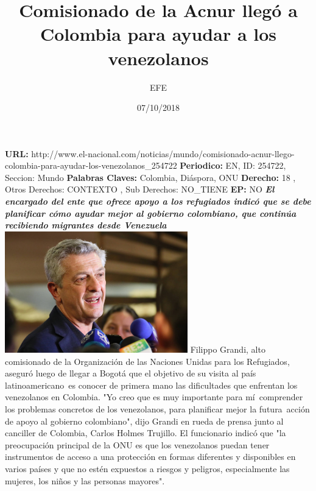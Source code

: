 \documentclass{article}%
\title{\textbf{Comisionado de la Acnur llegó a Colombia para ayudar a los venezolanos}}%
\author{EFE}%
\date{07/10/2018}%
\begin{document}
%
\normalsize%
\maketitle%
\textbf{URL: }%
http://www.el{-}nacional.com/noticias/mundo/comisionado{-}acnur{-}llego{-}colombia{-}para{-}ayudar{-}los{-}venezolanos\_254722\newline%
%
\textbf{Periodico: }%
EN, %
ID: %
254722, %
Seccion: %
Mundo\newline%
%
\textbf{Palabras Claves: }%
Colombia, Diáspora, ONU\newline%
%
\textbf{Derecho: }%
18%
, Otros Derechos: %
CONTEXTO%
, Sub Derechos: %
NO\_TIENE%
\newline%
%
\textbf{EP: }%
NO\newline%
\newline%
%
\textbf{\textit{El encargado del ente que ofrece apoyo a los refugiados indicó que se debe planificar cómo ayudar mejor al gobierno colombiano, que continúa recibiendo migrantes desde Venezuela~}}%
\newline%
\newline%
%
\includegraphics[width=300px]{185.jpg}%
\newline%
%
Filippo Grandi, alto comisionado de la Organización de las Naciones Unidas para los Refugiados, aseguró luego de llegar a Bogotá que el objetivo de su visita al país latinoamericano~es conocer de primera mano las dificultades que enfrentan los venezolanos en Colombia.%
\newline%
%
"Yo creo que es muy importante para mí~comprender los problemas concretos de los venezolanos, para planificar mejor la futura~acción de apoyo al gobierno colombiano", dijo Grandi en rueda de prensa junto al canciller de Colombia, Carlos Holmes Trujillo.%
\newline%
%
El funcionario indicó que "la preocupación principal de la ONU es que los venezolanos puedan tener instrumentos de acceso a una protección en formas diferentes y disponibles en varios países y que no estén expuestos a riesgos y peligros, especialmente las mujeres, los niños y las personas mayores".%
\end{document}
